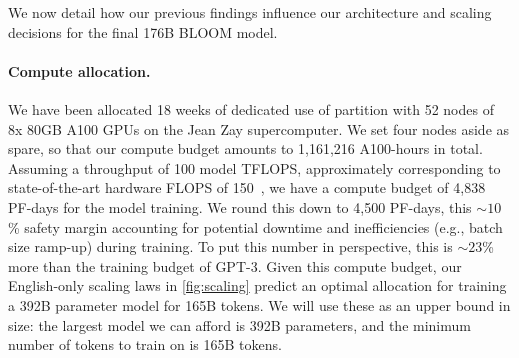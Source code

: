 We now detail how our previous findings influence our architecture and scaling decisions for the final 176B BLOOM model. %

\paragraph{Compute allocation.} We have been allocated 18 weeks of dedicated use of partition with 52 nodes of 8x 80GB A100 GPUs on the Jean Zay supercomputer. We set four nodes aside as spare, so that our compute budget amounts to 1,161,216 A100-hours in total. Assuming a throughput of 100 model TFLOPS, approximately corresponding to state-of-the-art hardware FLOPS of 150~\cite{narayanan2021efficient}, we have a compute budget of 4,838 PF-days for the model training. We round this down to 4,500 PF-days, this $\sim10$\% safety margin accounting for potential downtime and inefficiencies (e.g., batch size ramp-up) during training. To put this number in perspective, this is $\sim23$\% more than the training budget of GPT-3. Given this compute budget, our English-only scaling laws in \ref{fig:scaling} predict an optimal allocation for training a 392B parameter model for 165B tokens. We will use these as an upper bound in size: the largest model we can afford is 392B parameters, and the minimum number of tokens to train on is 165B tokens.

